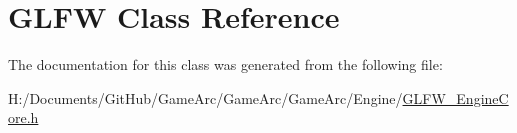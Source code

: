 \hypertarget{class_g_l_f_w}{\section{G\+L\+F\+W Class Reference}
\label{class_g_l_f_w}
}


The documentation for this class was generated from the following file\+:\begin{DoxyCompactItemize}
\item 
H\+:/\+Documents/\+Git\+Hub/\+Game\+Arc/\+Game\+Arc/\+Game\+Arc/\+Engine/\hyperlink{_g_l_f_w___engine_core_8h}{G\+L\+F\+W\+\_\+\+Engine\+Core.\+h}\end{DoxyCompactItemize}
